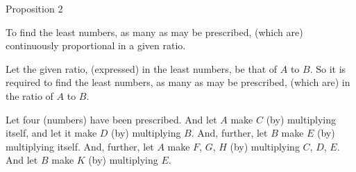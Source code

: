 
\begin{center}
{\large Proposition 2}
\end{center}

To find the least numbers, as many as may be prescribed,  (which are) continuously proportional
in a given ratio.

Let the given ratio, (expressed) in the least numbers, be that of $A$ to $B$.
So it is required to find the least numbers, as many as may be prescribed, 
(which are) in the ratio of $A$ to $B$. 

Let four (numbers) have been prescribed. And let $A$ make $C$ (by) multiplying itself, and let it make $D$ (by) multiplying $B$.
And, further, let $B$ make $E$ (by) multiplying itself. And, further, 
let $A$ make $F$, $G$,  $H$ (by) multiplying $C$, $D$,  $E$. And let $B$ make $K$ (by) multiplying $E$.

\epsfysize=2in
\centerline{}

